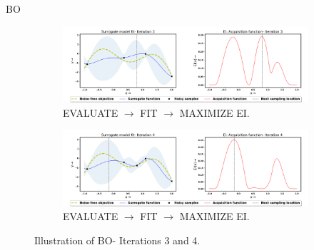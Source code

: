 \documentclass[10pt]{beamer}
\begin{document}
\begin{frame}{BO}
    \begin{figure}[!ht]
		\centering
		\begin{subfigure}{1\textwidth}
  			\centering
  			\includegraphics[scale=0.238]{images/BO3.png}
  			\caption{EVALUATE $\rightarrow$ FIT $\rightarrow$ MAXIMIZE EI.}
  			\label{fig:BO3}
		\end{subfigure}
		
	\begin{subfigure}{1\textwidth}
  			\centering
  			\includegraphics[scale=0.238]{images/BO4.png}
  			\caption{EVALUATE $\rightarrow$ FIT $\rightarrow$ MAXIMIZE EI.}
  			\label{fig:BO4}
		\end{subfigure}
		
\captionsetup{justification=justified}
\caption[Illustration of BO- Iterations 1 to 4.]{Illustration of BO- Iterations 3 and 4.}
\label{fig:BO_steps2}
\end{figure}
\end{frame}
\end{document}
